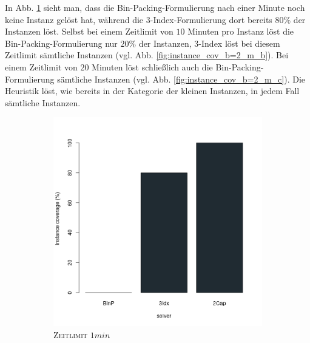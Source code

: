 In Abb. \ref{fig:instance_cov_b=2_m_a} sieht man, dass die Bin-Packing-Formulierung nach einer Minute noch keine Instanz gelöst hat, während die
3-Index-Formulierung dort bereits $80 \%$ der Instanzen löst. Selbst bei einem Zeitlimit von $10$ Minuten pro Instanz löst die Bin-Packing-Formulierung nur $20 \%$ der Instanzen, 3-Index löst bei diesem Zeitlimit sämtliche Instanzen
(vgl. Abb. \ref{fig:instance_cov_b=2_m_b}).
Bei einem Zeitlimit von $20$ Minuten löst schließlich auch die Bin-Packing-Formulierung sämtliche Instanzen
(vgl. Abb. \ref{fig:instance_cov_b=2_m_c}). Die Heuristik löst, wie bereits in der Kategorie der kleinen Instanzen,
in jedem Fall sämtliche Instanzen.
\begin{figure}[H]
\centering

\begin{subfigure}[b]{0.3\textwidth}
\centering
\includegraphics[width=1.2\textwidth]{img/solver_instance_coverage_b=2_m_60s.png}
\caption{\textsc{Zeitlimit} $1min$}
\label{fig:instance_cov_b=2_m_a}
\end{subfigure}
\hfill
\begin{subfigure}[b]{0.3\textwidth}
\centering

\end{subfigure}
\end{figure}
